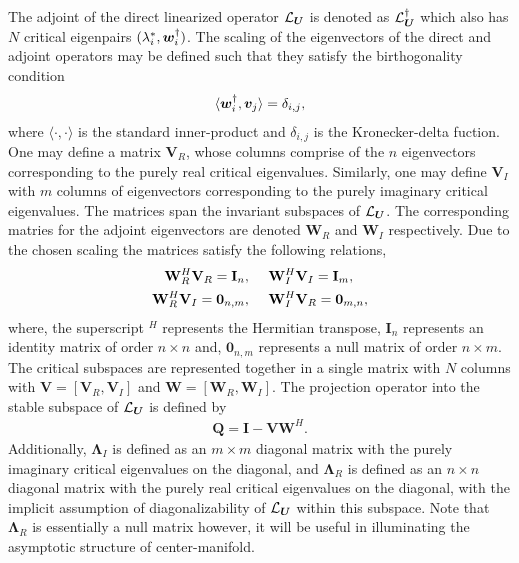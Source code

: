 The adjoint of the direct linearized operator $\mathcal{L}_{\boldsymbol{U}}$ is denoted as $\mathcal{L}_{\boldsymbol{U}}^{\dagger}$ which also has $N$ critical eigenpairs $(\lambda^{*}_{i}, \boldsymbol{w}^{\dagger}_{i})$. The scaling of the eigenvectors of the direct and adjoint operators may be defined such that they satisfy the birthogonality condition
\begin{eqnarray}
	\langle\boldsymbol{w}^{\dagger}_{i},\boldsymbol{v}_{j}\rangle = \delta_{i,j} \label{eqn:std_biorthogonality},
\end{eqnarray}
where $\langle\cdot,\cdot\rangle$ is the standard inner-product and $\delta_{i,j}$ is the Kronecker-delta fuction. One may define a matrix $\mathbf{V}_{R}$, whose columns comprise of the $n$ eigenvectors corresponding to the purely real critical eigenvalues. Similarly, one may define $\mathbf{V}_{I}$ with $m$ columns of eigenvectors corresponding to the purely imaginary critical eigenvalues. The matrices span the invariant subspaces of $\mathcal{L}_{\boldsymbol{U}}$. The corresponding matries for the adjoint eigenvectors are denoted $\mathbf{W}_{R}$ and $\mathbf{W}_{I}$ respectively. Due to the chosen scaling the matrices satisfy the following relations,
\begin{subequations}
	\begin{align}
		\mathbf{W}_{R}^{H}\mathbf{V}_{R} = \mathbf{I}_{n}, \hspace{5mm} & \mathbf{W}_{I}^{H}\mathbf{V}_{I} = \mathbf{I}_{m},	\\
		\mathbf{W}_{R}^{H}\mathbf{V}_{I} = \mathbf{0}_{n,m}, \hspace{5mm} & \mathbf{W}_{I}^{H}\mathbf{V}_{R} = \mathbf{0}_{m,n},
	\end{align}
	\label{eqn:biorthogonal_matrices}
\end{subequations}
where, the superscript $^{H}$ represents the Hermitian transpose, $\mathbf{I}_{n}$ represents an identity matrix of order $n\times n$ and, $\mathbf{0}_{n,m}$ represents a null matrix of order $n\times m$. The critical subspaces are represented together in a single matrix with $N$ columns with $\mathbf{V} = [\mathbf{V}_{R}, \mathbf{V}_{I}]$ and $\mathbf{W} = [\mathbf{W}_{R}, \mathbf{W}_{I}]$. The projection operator  into the stable subspace of $\mathcal{L}_{\boldsymbol{U}}$ is defined by
\begin{eqnarray}
	\label{eqn:stable_projector}
	\mathbf{Q} = \mathbf{I} - \mathbf{V}\mathbf{W}^{H}.
\end{eqnarray}
Additionally, $\mathbf{\Lambda}_{I}$ is defined as an $m\times m$ diagonal matrix with the purely imaginary critical eigenvalues on the diagonal, and $\mathbf{\Lambda}_{R}$ is defined as an $n\times n$ diagonal matrix with the purely real critical eigenvalues on the diagonal, with the implicit assumption of diagonalizability of $\mathcal{L}_{\boldsymbol{U}}$ within this subspace. Note that $\mathbf{\Lambda}_{R}$ is essentially a null matrix however, it will be useful in illuminating the asymptotic structure of center-manifold. 


